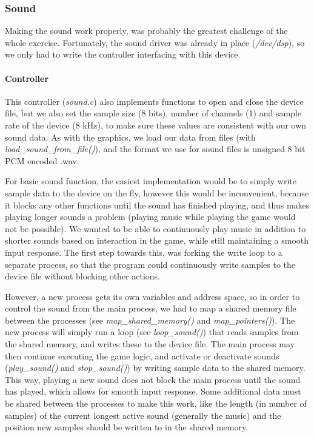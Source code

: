 \documentclass[a4paper,11pt]{article}
\begin{document}
\subsubsection{Sound}
Making the sound work properly, was probably the greatest challenge of the whole exercise. Fortunately, the sound driver was already in place (\textit{/dev/dsp}), so we only had to write the controller interfacing with this device. 
\paragraph{Controller} This controller (\textit{sound.c}) also implements functions to open and close the device file, but we also set the sample size (8 bits), number of channels (1) and sample rate of the device (8 kHz), to make sure these values are consistent with our own sound data. As with the graphics, we load our data from files (with \textit{load\_sound\_from\_file()}), and the format we use for sound files is unsigned 8 bit PCM encoded .wav.

For basic sound function, the easiest implementation would be to simply write sample data to the device on the fly, however this would be inconvenient, because it blocks any other functions until the sound has finished playing, and thus makes playing longer sounds a problem (playing music while playing the game would not be possible). We wanted to be able to continuously play music in addition to shorter sounds based on interaction in the game, while still maintaining a smooth input response. The first step towards this, was forking the write loop to a separate process, so that the program could continuously write samples to the device file without blocking other actions.

However, a new process gets its own variables and address space, so in order to control the sound from the main process, we had to map a shared memory file between the processes (see \textit{map\_shared\_memory()} and \textit{map\_pointers()}). The new process will simply run a loop (see \textit{loop\_sound()}) that reads samples from the shared memory, and writes these to the device file. The main process may then continue executing the game logic, and activate or deactivate sounds (\textit{play\_sound()} and \textit{stop\_sound()}) by writing sample data to the shared memory. This way, playing a new sound does not block the main process until the sound has played, which allows for smooth input response. Some additional data must be shared between the processes to make this work, like the length (in number of samples) of the current longest active sound (generally the music) and the position new samples should be written to in the shared memory.
\end{document}
